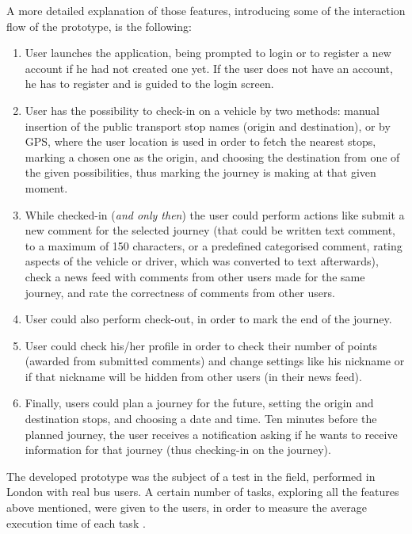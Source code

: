 A more detailed explanation of those features, introducing some of the interaction flow of the prototype, is the following:

\begin{enumerate}
\item User launches the application, being prompted to login or to register a new account if he had not created one yet. If the user does not have an account, he has to register and is guided to the login screen.

\item User has the possibility to check-in on a vehicle by two methods: manual insertion of the public transport stop names (origin and destination), or by GPS, where the user location is used in order to fetch the nearest stops, marking a chosen one as the origin, and choosing the destination from one of the given possibilities, thus marking the journey is making at that given moment.

\item While checked-in (\emph{and only then}) the user could perform actions like submit a new comment for the selected journey (that could be written text comment, to a maximum of 150 characters, or a predefined categorised comment, rating aspects of the vehicle or driver, which was converted to text afterwards), check a news feed with comments from other users made for the same journey, and rate the correctness of comments from other users.

\item User could also perform check-out, in order to mark the end of the journey.

\item User could check his/her profile in order to check their number of points (awarded from submitted comments) and change settings like his nickname or if that nickname will be hidden from other users (in their news feed).

\item Finally, users could plan a journey for the future, setting the origin and destination stops, and choosing a date and time. Ten minutes before the planned journey, the user receives a notification asking if he wants to receive information for that journey (thus checking-in on the journey).
 
\end{enumerate}

The developed prototype was the subject of a test in the field, performed in London with real bus users. A certain number of tasks, exploring all the features above mentioned, were given to the users, in order to measure the average execution time of each task \cite{kn:NGG13}.

